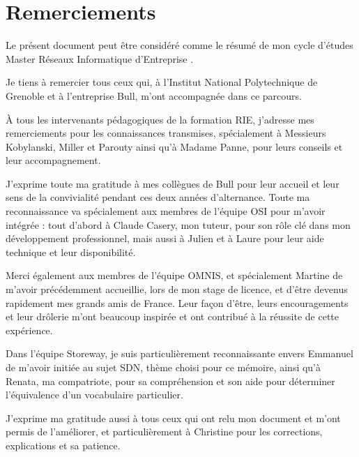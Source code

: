 \documentclass[a4paper,12pt,bibliography=totoc,index=totoc,twoside,francais]{scrbook}
\begin{document}


\frontmatter

\section*{Remerciements}

Le présent document peut être considéré comme le résumé de mon cycle d'études \og Master Réseaux Informatique d'Entreprise \fg{}.

Je tiens à  remercier tous ceux qui, à l'Institut National Polytechnique de Grenoble et à l'entreprise Bull, m'ont accompagnée dans ce parcours. 

À tous les intervenants pédagogiques de la formation RIE, j'adresse mes remerciements pour les connaissances transmises,  spécialement à Messieurs Kobylanski, Miller et Parouty ainsi qu'à Madame Panne, pour leurs conseils et leur accompagnement.

J'exprime toute ma gratitude à mes collègues de Bull pour leur accueil et leur sens de la convivialité pendant ces deux années d'alternance. Toute ma reconnaissance va spécialement aux membres de l'équipe OSI pour m'avoir intégrée : tout d'abord à Claude Casery, mon tuteur, pour son rôle clé dans mon développement professionnel, mais aussi à Julien et à Laure pour leur aide technique et leur disponibilité.

Merci également aux membres de l'équipe OMNIS, et spécialement Martine de m'avoir précédemment accueillie, lors de mon stage de licence, et d'être devenus rapidement mes grands amis de France. Leur façon d'être, leurs encouragements et leur drôlerie m'ont beaucoup inspirée et ont contribué à la réussite de cette expérience. 

Dans l'équipe Storeway, je suis particulièrement reconnaissante envers Emmanuel de m'avoir initiée au sujet SDN, thème choisi pour ce mémoire, ainsi qu'à Renata, ma compatriote, pour sa compréhension et son aide pour déterminer l'équivalence d'un vocabulaire particulier. 

J'exprime ma gratitude aussi à tous ceux qui ont relu mon document et m'ont permis de l'améliorer, et particulièrement à Christine pour les corrections, explications et sa patience.
\end{document}
